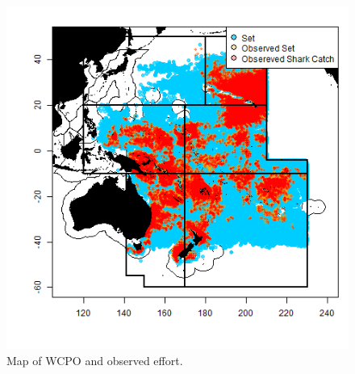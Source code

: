 \documentclass[12pt]{SCreport}
\begin{document}

\begin{figure}
\begin{center}
\includegraphics[scale=0.95]{../GRAPHICS/Defined/FIG_02_MAP_sets}
\caption{\label{fig:fig02} Map of WCPO and observed effort.}
\end{center}
\end{figure}
\end{document}
